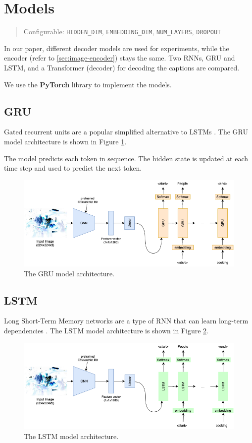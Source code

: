 \documentclass[12pt]{article}
\theoremstyle{plain}
\theoremstyle{definition}
\theoremstyle{remark}
\begin{document}
\section{Models}\label{sec:models}
\begin{quote}\center Configurable: \texttt{HIDDEN\_DIM}, \texttt{EMBEDDING\_DIM}, \texttt{NUM\_LAYERS}, \texttt{DROPOUT}\end{quote}
In our paper, different decoder models are used for experiments, while the encoder (refer to \ref{sec:image-encoder}) stays the same. Two RNNs, GRU and LSTM, and a Transformer (decoder) for decoding the captions are compared.
\par We use the \textbf{PyTorch} library to implement the models.

\subsection{GRU}\label{sec:gru}
Gated recurrent units are a popular simplified alternative to LSTMs \cite{cho2014gru}. The GRU model architecture is shown in Figure \ref{fig:gru}.
\par The model predicts each token in sequence. The hidden state is updated at each time step and used to predict the next token.
\begin{figure}[H]
    \centering
    \includegraphics[width=.9\textwidth]{res/gru.png}
    \caption{The GRU model architecture.}\label{fig:gru}
\end{figure}

\subsection{LSTM}\label{sec:lstm}
Long Short-Term Memory networks are a type of RNN that can learn long-term dependencies \cite{hochreiter1997lstm}. The LSTM model architecture is shown in Figure \ref{fig:lstm}.
\begin{figure}[H]
    \centering
    \includegraphics[width=.9\textwidth]{res/lstm.png}
    \caption{The LSTM model architecture.}\label{fig:lstm}
\end{figure}
\end{document}
